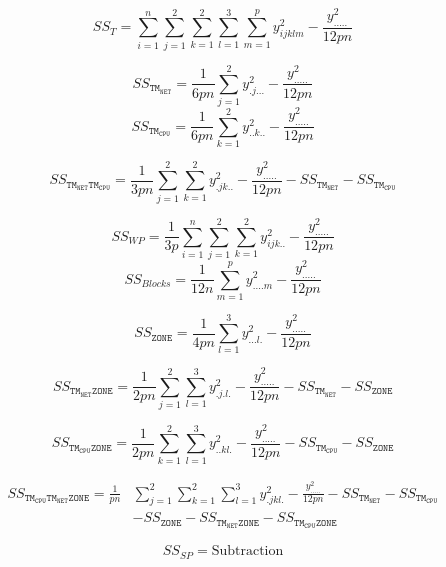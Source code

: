 
\begin{equation}
    SS_T = \sum_{i=1}^{n}\sum_{j=1}^{2}\sum_{k=1}^{2} \sum_{l=1}^{3}\sum_{m=1}^{p} y^{2}_{ijklm} - \frac{y^{2}_{.....}}{12pn}
\end{equation}

\begin{equation}
    SS_{\mathtt{TM_{NET}}} = \frac{1}{6pn}\sum_{j=1}^{2}y_{.j...}^2 - \frac{y^{2}_{.....}}{12pn}
\end{equation}
\begin{equation}
    SS_{\mathtt{TM_{CPU}}} = \frac{1}{6pn}\sum_{k=1}^{2}y_{..k..}^2 - \frac{y^{2}_{.....}}{12pn}
\end{equation}

\begin{equation}
    SS_{\mathtt{TM_{NET}TM_{CPU}}} = \frac{1}{3pn}\sum_{j=1}^{2}\sum_{k=1}^{2}y_{.jk..}^2 - \frac{y^{2}_{.....}}{12pn} - SS_{\mathtt{TM_{NET}}} - SS_{\mathtt{TM_{CPU}}}
\end{equation}

\begin{equation}
    SS_{WP} = \frac{1}{3p}\sum_{i=1}^{n}\sum_{j=1}^{2}\sum_{k=1}^{2}y_{ijk..}^2 - \frac{y^{2}_{.....}}{12pn}
\end{equation}
\begin{equation}
    SS_{Blocks} = \frac{1}{12n}\sum_{m=1}^{p}y_{....m}^2 - \frac{y^{2}_{.....}}{12pn}
\end{equation}

\begin{equation}
    SS_{\mathtt{ZONE}} = \frac{1}{4pn}\sum_{l=1}^{3}y_{...l.}^2 - \frac{y^{2}_{.....}}{12pn}
\end{equation}

\begin{equation}
    SS_{\mathtt{TM_{NET}ZONE}} = 
    \frac{1}{2pn}\sum_{j=1}^{2}\sum_{l=1}^{3} y_{.j.l.}^{2} - \frac{y^{2}_{.....}}{12pn} - SS_{\mathtt{TM_{NET}}} -  SS_{\mathtt{ZONE}}
\end{equation}

\begin{equation}
    SS_{\mathtt{TM_{CPU}ZONE}} = 
    \frac{1}{2pn}\sum_{k=1}^{2}\sum_{l=1}^{3} y_{..kl.}^{2} - \frac{y^{2}_{.....}}{12pn} - SS_{\mathtt{TM_{CPU}}} -  SS_{\mathtt{ZONE}} 
\end{equation}

\begin{equation}
\begin{split}
    SS_{\mathtt{TM_{CPU}TM_{NET}ZONE}}  = \frac{1}{pn}&\sum_{j=1}^{2}\sum_{k=1}^{2}\sum_{l=1}^{3} y_{.jkl.}^{2} - \frac{y^{2}_{.....}}{12pn} - SS_{\mathtt{TM_{NET}}} - SS_{\mathtt{TM_{CPU}}} \\ 
    &  - SS_{\mathtt{ZONE}} -  SS_{\mathtt{TM_{NET}ZONE}} -  SS_{\mathtt{TM_{CPU}ZONE}}
\end{split}
\end{equation}

\begin{equation}   SS_{SP} = \text{Subtraction}
\end{equation}